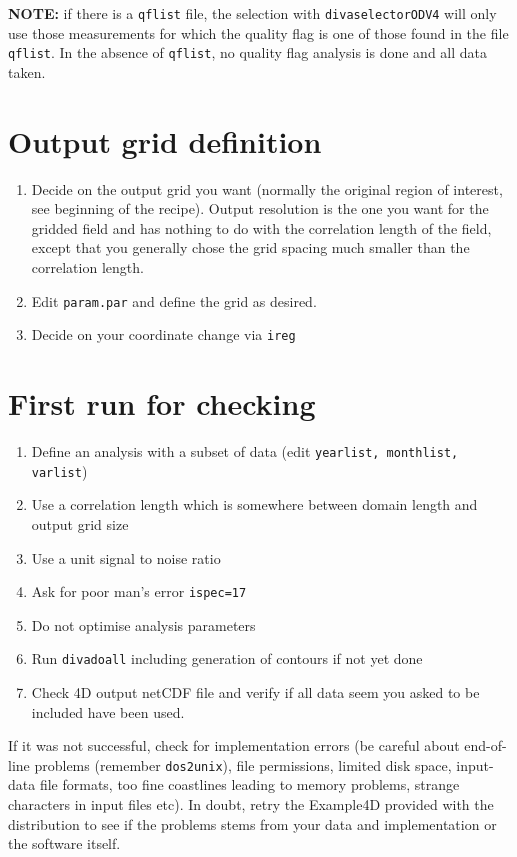\documentclass[8pt,a4paper,notitlepage]{book}
\begin{document}
{\bf NOTE:} if there is a {\tt qflist} file, the selection with {\tt divaselectorODV4} will only use those measurements for which the quality flag is one of those found in the file {\tt qflist}. In the absence of {\tt qflist}, no quality flag analysis is done and all data taken.
 


\section{Output grid definition}

\begin{enumerate}
\item
Decide on the output grid you want (normally the original region of interest, see beginning of the recipe). Output resolution is the one you want for the gridded field and has nothing to do with the correlation length of the field, except that you generally chose the grid spacing much smaller than the correlation length.
\item Edit {\tt param.par} and define the grid as desired.
\item Decide on your coordinate change via {\tt ireg}
\end{enumerate}


\section{First run for checking}
\begin{enumerate}
\item Define an analysis with a subset of data (edit {\tt yearlist, monthlist, varlist})
\item Use a correlation length which is somewhere between domain length and output grid size
\item Use a unit signal to noise ratio
\item Ask for poor man's error {\tt ispec=17}
\item Do not optimise analysis parameters
\item Run {\tt divadoall} including generation of contours if not yet done
\item Check 4D output netCDF file and verify if all data seem you asked to be included have been used.
\end{enumerate}
If it was not successful, check for implementation errors (be careful about end-of-line problems (remember {\tt dos2unix}), file permissions, limited disk space, input-data file formats, too fine coastlines leading to memory problems, strange characters in input files etc). In doubt, retry the Example4D provided with the distribution to see if the problems stems from your data and implementation or the software itself.
\end{document}
